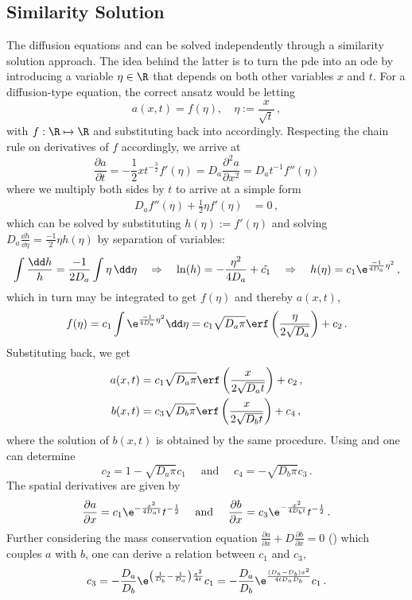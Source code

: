 \documentclass{prettytex/ox/mmsc-special-topic}
\begin{document}
  \subsection{Similarity Solution}
  The diffusion equations  and  can be solved independently through a similarity solution approach.
  The idea behind the latter is to turn the \gls{pde} into an \gls{ode} by introducing a variable $\eta \in \R$ that depends on both other variables $x$ and $t$.
  For a diffusion-type equation, the correct ansatz would be letting
  $$a(x, t) = f(\eta), \quad \eta := \frac{x}{\sqrt{t}}\,,$$
  with $f: \R \mapsto \R$ and substituting back into  accordingly.
  Respecting the chain rule on derivatives of $f$ accordingly, we arrive at
  $$\frac{\partial a}{\partial t} = -\frac{1}{2} x t^{-\frac{3}{2}} f'(\eta) = D_a \frac{\partial^2 a}{\partial x^2} = D_a t^{-1} f''(\eta)$$
  where we multiply both sides by $t$ to arrive at a simple form
  \begin{align}
    \label{eq:similarity-solution-ode} D_a f''(\eta) + \frac{1}{2} \eta f'(\eta) & = 0\,,
  \end{align}
  which can be solved by substituting $h(\eta) := f'(\eta)$ and solving $D_a \frac{\dd h}{\dd \eta} = \frac{-1}{2} \eta h(\eta)$ by separation of variables:
  $$\int\frac{\dd h}{h} = \frac{-1}{2D_a} \int \eta \,\dd\eta \quad \Rightarrow \quad \ln(h) = -\frac{\eta^2}{4D_a} + \tilde{c_1} \quad\Rightarrow\quad h(\eta) = c_1 \e^{\frac{-1}{4D_a}\eta^2}\,,$$
  which in turn may be integrated to get $f(\eta)$ and thereby $a(x, t)$,
  $$f(\eta) = c_1 \int \e^{\frac{-1}{4D_a}\eta^2} \dd\eta = c_1 \sqrt{D_a \pi} \erf\left(\frac{\eta}{2 \sqrt{D_a}}\right) + c_2\,.$$
  Substituting back, we get
  \begin{align}
    a(x, t) & = c_1 \sqrt{D_a \pi} \erf\left(\frac{x}{2 \sqrt{D_a t}}\right) + c_2\,, \\
    b(x, t) & = c_3 \sqrt{D_b \pi} \erf\left(\frac{x}{2 \sqrt{D_b t}}\right) + c_4\,,
  \end{align}
  where the solution of $b(x, t)$ is obtained by the same procedure.
  Using  and  one can determine $$c_2 = 1 - \sqrt{D_a \pi} c_1\quad \text{ and }\quad c_4 = -\sqrt{D_b \pi} c_3\,.$$
  The spatial derivatives are given by
  $$\frac{\partial a}{\partial x} = c_1 \e^{-\frac{x^2}{4D_at}} t^{-\frac{1}{2}} \quad \text{ and }\quad \frac{\partial b}{\partial x} = c_3 \e^{-\frac{x^2}{4D_bt}} t^{-\frac{1}{2}}\,.$$
  Further considering the mass conservation equation $\frac{\partial a}{\partial x} + D \frac{\partial b}{\partial x} = 0$ () which couples $a$ with $b$, one can derive a relation between $c_1$ and $c_3$,
  $$c_3 = -\frac{D_a}{D_b} \e^{\left(\frac{1}{D_b} - \frac{1}{D_a}\right) \frac{x^2}{4t}} c_1 = -\frac{D_a}{D_b} \e^{\frac{(D_a-D_b) x^2}{4t D_a D_b}} c_1\,.$$
\end{document}
